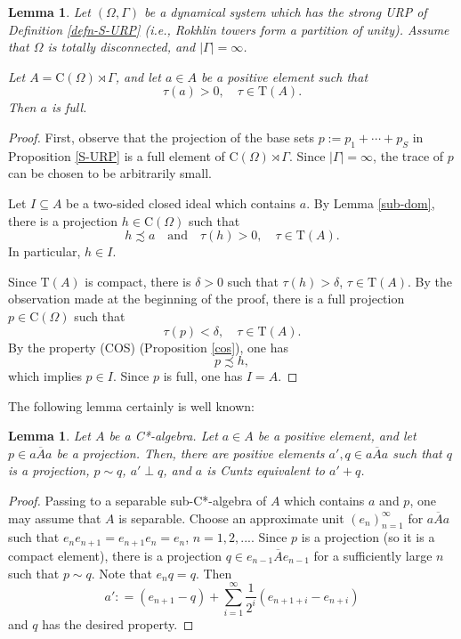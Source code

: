 \documentclass[12pt, oneside, psamsfonts]{amsart}
\newtheorem{lem}[thm]{Lemma}
\theoremstyle{definition}
\theoremstyle{remark}
\newtheorem{rem}[thm]{Remark}
\numberwithin{equation}{section}
\newcommand{\abs}[1]{\left\vert#1\right\vert}
\newcommand{\tr}{\mathrm{T}}
\begin{document}
\begin{lem}\label{full-element}
Let $(\Omega, \Gamma)$ be a dynamical system which has the strong URP of Definition \ref{defn-S-URP} (i.e., Rokhlin towers form a partition of unity). Assume that $\Omega$ is totally disconnected, and $\abs{\Gamma} = \infty$. 


Let $A = \mathrm{C}(\Omega) \rtimes \Gamma$, and let $a \in A$ be a positive element such that $$\tau(a) > 0,\quad \tau \in \tr(A).$$ Then $a$ is full.
\end{lem}
\begin{proof}
First, observe that the projection of the base sets $p:=p_1 + \cdots +p_S$ in Proposition \ref{S-URP} is a full element of $\mathrm{C}(\Omega) \rtimes \Gamma$. Since $\abs{\Gamma} = \infty$, the trace of $p$ can be chosen to be arbitrarily small.


Let $I \subseteq A$ be a two-sided closed ideal which contains $a$. By Lemma \ref{sub-dom}, there is a projection $h \in \mathrm{C}(\Omega)$ such that 
$$ h \precsim a \quad \mathrm{and} \quad \tau(h) > 0, \quad \tau \in \tr(A). $$
In particular, $h \in I$. 

Since $\tr(A)$ is compact, there is $\delta >0$ such that $ \tau(h) > \delta$, $\tau \in \tr(A)$. By the observation made at the beginning of the proof, there is a full  projection $p \in \mathrm{C}(\Omega)$ such that $$ \tau(p) < \delta, \quad \tau \in \tr(A).$$
By the property (COS) (Proposition \ref{cos}), one has $$p \precsim  h,$$ which implies $p \in I$. Since $p$ is full, one has $I=A$.
\end{proof}


The following lemma certainly is well known:
\begin{lem}\label{cut-out-proj}
Let $A$ be a C*-algebra. Let $a \in A$ be a positive element, and let $p\in \overline{aAa}$ be a projection. Then, there are positive elements $a', q \in \overline{aAa}$ such that $q$ is a projection, $p \sim q$, $a' \perp q$, and $a$ is Cuntz equivalent to $a'+q$.
\end{lem}
\begin{proof}
Passing to a separable sub-C*-algebra of $A$ which contains $a$ and $p$, one may assume that $A$ is separable. Choose an approximate unit $(e_n)_{n=1}^\infty$ for $\overline{aAa}$ such that $e_n e_{n+1} = e_{n+1} e_n = e_n$, $n=1, 2, ...$. Since $p$ is a projection (so it is a compact element), there is a projection $q \in \overline{e_{n-1}Ae_{n-1}}$ for a sufficiently large $n$ such that $p \sim q$. Note that $e_n q = q$. Then $$a ' : = (e_{n+1} - q) + \sum_{i=1}^\infty\frac{1}{2^i}(e_{n+1+i} - e_{n+i})$$
and $q$ has the desired property.
\end{proof}
\end{document}
